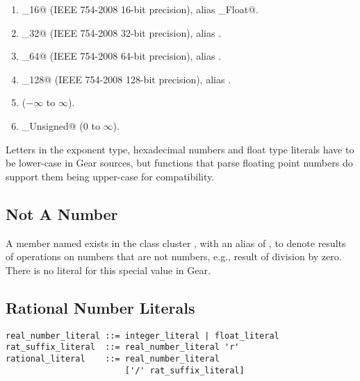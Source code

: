 \begin{enumerate}

  \item \lstinline@Float_16@ (IEEE 754-2008 16-bit precision), alias \lstinline@Half_Float@. 
  
  \item \lstinline@Float_32@ (IEEE 754-2008 32-bit precision), alias \lstinline@Float@. 

  \item \lstinline@Float_64@ (IEEE 754-2008 64-bit precision), alias \lstinline@Double@.

  \item \lstinline@Float_128@ (IEEE 754-2008 128-bit precision), alias \lstinline@Quadruple@.

  \item \lstinline@Decimal@ ($-\infty$ to $\infty$).

  \item \lstinline@Decimal_Unsigned@ ($0$ to $\infty$).

\end{enumerate}

Letters in the exponent type, hexadecimal numbers and float type literals have to be lower-case in Gear sources, but functions that parse floating point numbers do support them being upper-case for compatibility. 





\subsection{Not A Number}
\label{sec:nan}

A member named  exists in the class cluster , with an alias of , to denote results of operations on numbers that are not numbers, e.g., result of division by zero. There is no literal for this special value in Gear. 





\subsection{Rational Number Literals}
\label{sec:rationalliterals}

\syntax\begin{lstlisting}
real_number_literal ::= integer_literal | float_literal
rat_suffix_literal  ::= real_number_literal 'r'
rational_literal    ::= real_number_literal 
                        ['/' rat_suffix_literal]
\end{lstlisting}

